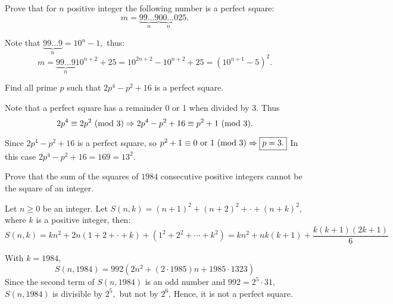 \documentclass{article}
\begin{document}
\begin{example*}[Example 3]
    Prove that for $n$ positive integer the following number is a perfect square:
    \[
        m = \underbrace{99 \ldots 9}_{n}\underbrace{00 \ldots 0}_{n}25.
    \]
\end{example*}

\begin{soln}
    Note that $\underbrace{99 \ldots 9}_{n} = 10^n-1,$ thus:
    \[
        m = \underbrace{99 \ldots 9}_{n} 10^{n+2} + 25 = 10^{2n+2} - 10^{n+2} + 25 = \boxed{(10^{n+1} - 5)^2.}
    \]
\end{soln}

\begin{example*}[Example 4]
    Find all prime $p$ such that $2p^4-p^2 + 16$ is a perfect square.
\end{example*}

\begin{soln}
    Note that a perfect square has a remainder 0 or 1 when divided by 3.
    Thus 
    \[
        2p^4 \equiv 2p^2 \ (\mathrm{mod}\ 3) \Rightarrow 2p^4-p^2 + 16 \equiv p^2 + 1 \ (\mathrm{mod}\ 3).
    \]

    Since $2p^4-p^2 + 16$ is a perfect square, so $p^2 + 1 \equiv 0 \text{\ or\ } 1 \ (\mathrm{mod}\ 3) \Rightarrow \boxed{p = 3.}$
    In this case $2p^4-p^2 + 16 = 169 = 13^2.$
\end{soln}

\begin{example*}[Example 5]
    Prove that the sum of the squares of $1984$ consecutive positive integers cannot be the square of an integer.
\end{example*}

\begin{soln}
    Let $n \ge 0$ be an integer. Let $S(n, k) = (n+1)^2 + (n+2)^2 + \cdot + (n+k)^2,$ where $k$ is a positive integer, then:
    \[
        S(n, k) = kn^2 + 2n(1+2+\cdot +k)+(1^2+2^2+\cdots+k^2)
        = kn^2 + nk(k+1) + \frac{k(k+1)(2k+1)}{6}
    \]

    With $k=1984,$ 
    \[
        S(n, 1984) = 992 (2n^2+(2\cdot 1985)n+ 1985\cdot 1323)
    \]
    Since the second term of $S(n, 1984)$ is an odd number and $992 = 2^5 \cdot 31,$ $S(n, 1984)$ is divisible by $2^5,$ 
    but not by $2^6.$ Hence, it is not a perfect square.
\end{soln}
\end{document}
